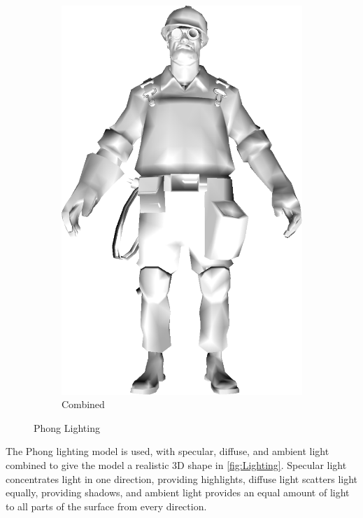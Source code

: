 \begin{figure}[h]
\begin{subfigure}[b]{0.18\textwidth}
        \includegraphics[width=\textwidth]{img/Lighting/combined.png}
        \caption{Combined}
        \label{fig:combined}
    \end{subfigure}
    \caption{Phong Lighting}
    \label{fig:Lighting}
\end{figure}

The Phong lighting model is used, with specular, diffuse, and ambient light combined to give 
the model a realistic 3D shape in \autoref{fig:Lighting}. Specular light concentrates light in one direction, providing 
highlights, diffuse light scatters light equally, providing shadows, and ambient light provides 
an equal amount of light to all parts of the surface from every direction. 


